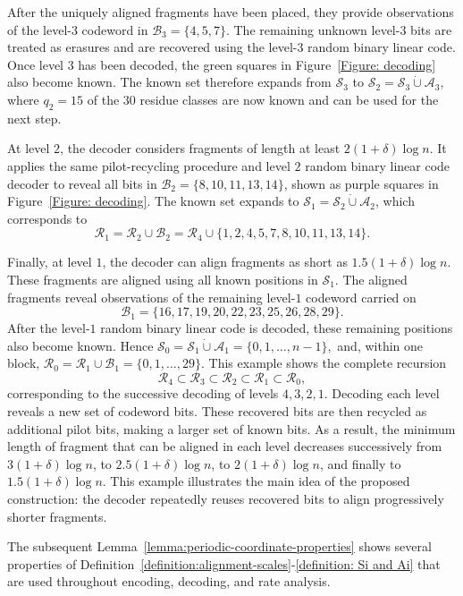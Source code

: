 \documentclass[journal,letterpaper,onecolumn,11pt]{IEEEtran}
\newcommand{\cA}{\mathcal{A}}
\newcommand{\cB}{\mathcal{B}}
\newcommand{\cR}{\mathcal{R}}
\newcommand{\cS}{\mathcal{S}}
\begin{document}
After the uniquely aligned fragments have been placed, they provide
observations of the level-\(3\) codeword in
$
\cB_3=\{4,5,7\}.
$
The remaining unknown level-\(3\) bits are treated as erasures and are
recovered using the level-\(3\) random binary linear code. 
Once level \(3\)
has been decoded, the green squares in Figure~\ref{Figure: decoding} also become known.
The known set therefore expands from
\(\cS_3\) to
\(\cS_2=\cS_3\mathbin{\dot\cup}\cA_3,\) where \(q_2=15\) of the \(30\) residue classes are now known and can be
used for the next step.

At level \(2\),  the decoder considers fragments of length at
least \(2(1+\delta)\log n\). 
It applies the same pilot-recycling procedure and level \(2\) random binary linear code decoder to reveal all bits in $\cB_2=\{8,10,11,13,14\}$,
shown as purple squares in Figure~\ref{Figure: decoding}.
The known set expands to $\cS_1=\cS_2\mathbin{\dot\cup}\cA_2$,
which corresponds to
\[
\cR_1
=
\cR_2\cup\cB_2
=
\cR_4\cup
\{1,2,4,5,7,8,10,11,13,14\}.
\]

Finally, at level \(1\), the decoder can align fragments as
short as \(1.5(1+\delta)\log n\).
These fragments are aligned using all
known positions in \(\cS_1\). 
The aligned fragments reveal observations of
the remaining level-\(1\) codeword carried on
\[
\cB_1
=
\{16,17,19,20,22,23,25,26,28,29\}.
\]
After the level-\(1\) random binary linear code is decoded, these remaining positions also become known.
Hence
$
\cS_0=\cS_1\mathbin{\dot\cup}\cA_1
=\{0,1,\ldots,n-1\},
$
and, within one block,
$
\cR_0
=
\cR_1\cup\cB_1
=
\{0,1,\ldots,29\}.
$
This example shows the complete recursion
\[
\cR_4
\subset
\cR_3
\subset
\cR_2
\subset
\cR_1
\subset
\cR_0,
\]
corresponding to the successive decoding of levels \(4,3,2,1\).
Decoding each level reveals a new set of codeword bits.
These recovered bits are then recycled as additional pilot bits, making a larger
set of known bits. 
As a result, the minimum length of fragment that can be aligned in each level
decreases successively from
\(3(1+\delta)\log n\), to
\(2.5(1+\delta)\log n\), to
\(2(1+\delta)\log n\), and finally to
\(1.5(1+\delta)\log n\).
This example illustrates the main idea of the proposed construction:
the decoder repeatedly reuses recovered bits to align
progressively shorter fragments.

The subsequent Lemma~\ref{lemma:periodic-coordinate-properties} shows several properties of Definition~\ref{definition:alignment-scales}-\ref{definition: Si and Ai} that are used throughout encoding, decoding, and rate analysis.
\end{document}
